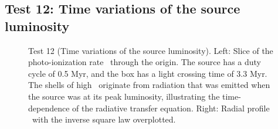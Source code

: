 \documentclass[12pt,preprint]{aastex}
\begin{document}


\subsection{Test 12: Time variations of the source luminosity}

\begin{figure}[t]
  \caption{\label{fig:test12_kph} Test 12 (Time variations of the
    source luminosity).  Left: Slice of the photo-ionization rate
    \kph~through the origin.  The source has a duty cycle of 0.5 Myr,
    and the box has a light crossing time of 3.3 Myr.  The shells of
    high \kph~originate from radiation that was emitted when the
    source was at its peak luminosity, illustrating the
    time-dependence of the radiative transfer equation.  Right: Radial
    profile \kph~with the inverse square law overplotted.}
\end{figure}
\end{document}
